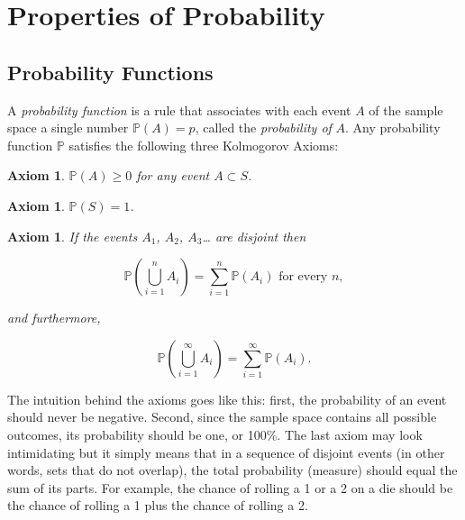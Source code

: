 \documentclass[]{book}
\numberwithin{equation}{chapter}
\numberwithin{figure}{chapter}
\theoremstyle{plain}
\newtheorem{axiom}[thm]{Axiom}
\theoremstyle{definition}
\theoremstyle{remark}
\theoremstyle{definition}
\theoremstyle{definition}
\theoremstyle{remark}
\begin{document}
\section{Properties of Probability}\label{sec-properties-of-probability}

\subsection{Probability Functions}\label{sub-probability-functions}

A \emph{probability function} is a rule that associates with each event
\(A\) of the sample space a single number \(\mathbb{P}(A)=p\), called
the \emph{probability of} \(A\). Any probability function \(\mathbb{P}\)
satisfies the following three Kolmogorov Axioms:

\bigskip

\begin{axiom}
\(\mathbb{P}(A)\geq0\) for any event \(A\subset S\).
\end{axiom}

\bigskip

\begin{axiom}
\(\mathbb{P}(S)=1\).
\end{axiom}

\bigskip

\begin{axiom}
If the events \(A_{1}\), \(A_{2}\), \(A_{3}\)\ldots{} are disjoint then

\begin{equation}
\mathbb{P}\left(\bigcup_{i=1}^{n}A_{i}\right)=\sum_{i=1}^{n}\mathbb{P}(A_{i})\mbox{ for every }n,
\end{equation}

and furthermore,

\begin{equation}
\mathbb{P}\left(\bigcup_{i=1}^{\infty}A_{i}\right)=\sum_{i=1}^{\infty}\mathbb{P}(A_{i}).
\end{equation}
\end{axiom}

The intuition behind the axioms goes like this: first, the probability
of an event should never be negative. Second, since the sample space
contains all possible outcomes, its probability should be one, or 100\%.
The last axiom may look intimidating but it simply means that in a
sequence of disjoint events (in other words, sets that do not overlap),
the total probability (measure) should equal the sum of its parts. For
example, the chance of rolling a 1 or a 2 on a die should be the chance
of rolling a 1 plus the chance of rolling a 2.
\end{document}
